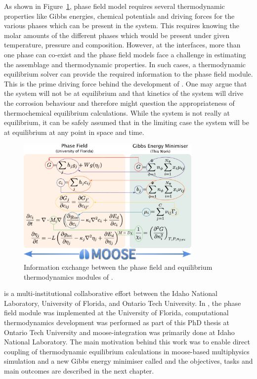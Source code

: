 	As shown in Figure~\ref{fig:yj_io}, {\YJ} phase field model requires several thermodynamic properties like Gibbs energies, chemical potentials and driving forces for the various phases which can be present in the system. This requires knowing the molar amounts of the different phases which would be present under given temperature, pressure and composition. However, at the interfaces, more than one phase can co-exist and the phase field models face a challenge in estimating the assemblage and thermodynamic properties. In such cases, a thermodynamic equilibrium solver can provide the required information to the phase field module. This is the prime driving force behind the development of {\GEM}. One may argue that the system will not be at equilibrium and that kinetics of the system will drive the corrosion behaviour and therefore might question the appropriateness of thermochemical equilibrium calculations. While the system is not really at equilibrium, it can be safely assumed that in the limiting case the system will be at equilibrium at any point in space and time.
	\begin{figure}[htb]
		\centering
		\includegraphics[width=0.8\textwidth]{figures/chapter-1/YJ_PF_IO.pdf}
		\caption{Information exchange between the phase field and equilibrium thermodynamics modules of \YJ.}
		\label{fig:yj_io}
	\end{figure} 	

	{\YJ} is a multi-institutional collaborative effort between the Idaho National Laboratory, University of Florida, and Ontario Tech University.  In {\YJ}, the phase field module was implemented at the University of Florida, computational thermodynamics development was performed as part of this PhD thesis at Ontario Tech University and \gls{moose}-integration was primarily done at Idaho National Laboratory. The main motivation behind this work was to enable direct coupling of thermodynamic equilibrium calculations in \gls{moose}-based multiphysics simulation and a new Gibbs energy minimiser called {\GEM} and the objectives, tasks and main outcomes are described in the next chapter.
	
